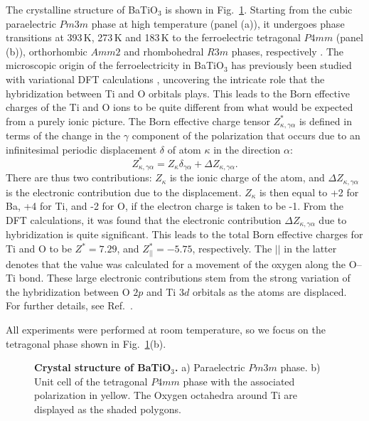 The crystalline structure of BaTiO$_3$ is shown in Fig.~\ref{fig:BTO_crystal}.
Starting from the cubic paraelectric $Pm3m$ phase at high temperature (panel (a)), it undergoes phase transitions at 393\,K, 273\,K and 183\,K to the ferroelectric tetragonal $P4mm$ (panel (b)), orthorhombic $Amm2$ and rhombohedral $R3m$ phases, respectively \cite{Mason1948, VonHippel1950, Marton2010}.
The microscopic origin of the ferroelectricity in BaTiO$_3$ has previously been studied with variational \gls{DFT} calculations \cite{Ghosez1995}, uncovering the intricate role that the hybridization between Ti and O orbitals plays.
This leads to the Born effective charges of the Ti and O ions to be quite different from what would be expected from a purely ionic picture.
The Born effective charge tensor $Z^*_{\kappa, \gamma\alpha}$ is defined in terms of the change in the $\gamma$ component of the polarization that occurs due to an infinitesimal periodic displacement $\delta$ of atom $\kappa$ in the direction $\alpha$:
\begin{equation}
Z^*_{\kappa, \gamma\alpha} = Z_{\kappa} \delta_{\gamma\alpha} + \Delta Z_{\kappa, \gamma\alpha}.
\end{equation}
There are thus two contributions: $Z_{\kappa}$ is the ionic charge of the atom, and $\Delta Z_{\kappa, \gamma\alpha}$ is the electronic contribution due to the displacement.
$Z_{\kappa}$ is then equal to +2 for Ba, +4 for Ti, and -2 for O, if the electron charge is taken to be -1.
From the \gls{DFT} calculations, it was found that the electronic contribution $\Delta Z_{\kappa, \gamma\alpha}$ due to hybridization is quite significant.
This leads to the total Born effective charges for Ti and O to be $Z^* = 7.29$, and $Z^*_{||} = -5.75$, respectively.
The $||$ in the latter denotes that the value was calculated for a movement of the oxygen along the O--Ti bond.
These large electronic contributions stem from the strong variation of the hybridization between O $2p$ and Ti $3d$ orbitals as the atoms are displaced.
For further details, see Ref.~\cite{Ghosez1995}.

All experiments were performed at room temperature, so we focus on the tetragonal phase shown in Fig.~\ref{fig:BTO_crystal}(b).
\begin{figure}[h]
	\caption{\label{fig:BTO_crystal}{\bf Crystal structure of BaTiO$_3$.} a) Paraelectric $Pm3m$ phase. b) Unit cell of the tetragonal $P4mm$ phase with the associated polarization in yellow. The Oxygen octahedra around Ti are displayed as the shaded polygons.}
\end{figure}

